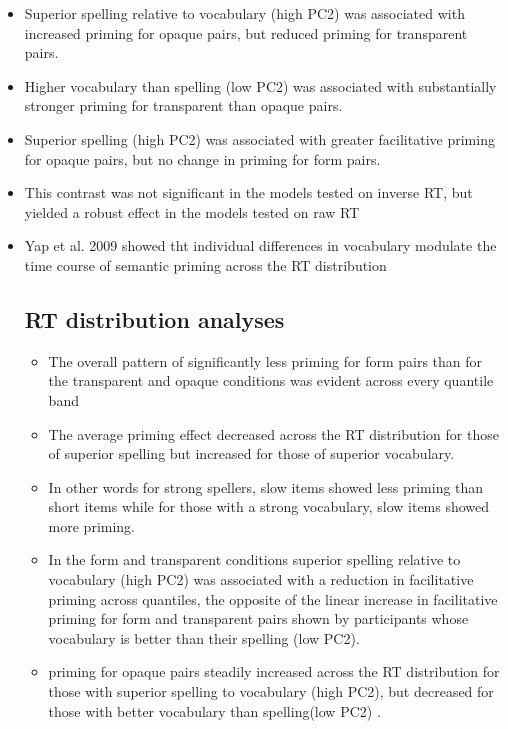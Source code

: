 \documentclass[]{article}
\begin{document}
\begin{itemize}
			\item Superior spelling relative to vocabulary (high PC2) was associated with increased priming for opaque pairs, but reduced priming for transparent pairs. 
			\item Higher vocabulary than spelling (low PC2) was associated with substantially stronger priming for transparent than opaque pairs. 
			\item Superior spelling (high PC2) was associated with greater facilitative priming for opaque pairs, but no change in priming for form pairs.
			\item This contrast was not significant in the models tested on inverse RT, but yielded a robust effect in the models tested on raw RT 
			\item Yap et al. 2009 showed tht individual differences in vocabulary modulate the time course of semantic priming across the RT distribution
			
			\subsection{RT distribution analyses}
			\begin{itemize}
				\item The overall pattern of significantly less priming for form pairs than for the transparent and opaque conditions was evident across every quantile band
				\item The average priming effect decreased across the RT distribution for those of superior spelling but increased for those of superior vocabulary.
				\item In other words for strong spellers, slow items showed less priming than short items while for those with a strong vocabulary, slow items showed more priming.
				\item In the form and transparent conditions superior spelling relative to vocabulary (high PC2) was associated with a reduction in facilitative priming across quantiles, the opposite of the linear increase in facilitative priming for form and transparent pairs shown by  participants whose vocabulary is better than their spelling (low PC2).
				\item priming for opaque pairs steadily increased across the RT distribution for those with superior spelling to vocabulary (high PC2), but decreased for those with better vocabulary than spelling(low PC2) .
				
			\end{itemize}			
			 
		\end{itemize}
\end{document}

